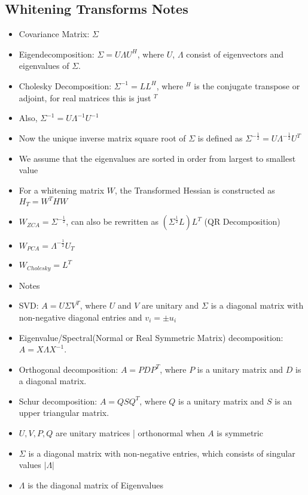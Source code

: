 \subsection{Whitening Transforms Notes}

\begin{itemize}

\item Covariance Matrix: $\Sigma$
\item Eigendecomposition: $\Sigma = U\Lambda U^{H}$, where $U$,  $\Lambda$ consist of eigenvectors and eigenvalues of $\Sigma$.
\item Cholesky Decomposition: $\Sigma^{-1} = LL^{H}$, where $^{H}$ is the conjugate transpose or adjoint, for real matrices this is just $^{T}$
\item Also, $\Sigma^{-1} = U \Lambda^{-1} U^{-1}$
\item Now the unique inverse matrix square root of $\Sigma$ is defined as  $\Sigma^{−\frac{1}{2}} = U\Lambda^{-\frac{1}{2}}U^{T}$
\item We assume that the eigenvalues are sorted in order from largest to smallest value
\item For a whitening matrix $W$, the Transformed Hessian is constructed as $H_{T} = W^{T}HW$
\item $W_{ZCA} = \Sigma^{−\frac{1}{2}}$, can also be rewritten as $(\Sigma^{\frac{1}{2}} L) L^{T}$ (QR Decomposition)
\item $W_{PCA} = \Lambda^{-\frac{1}{2}}U_{T}$
\item $W_{Cholesky} = L^{T}$
\item Notes
\item SVD: $A=U \Sigma V^T$, where $U$ and $V$ are unitary and $\Sigma$ is a diagonal matrix with non-negative diagonal entries and $v_i= \pm u_i$
\item Eigenvalue/Spectral(Normal or Real Symmetric Matrix) decomposition: $A=X \Lambda X^{-1}$.
\item Orthogonal decomposition: $A=P D P^T$, where $P$ is a unitary matrix and $D$ is a diagonal matrix.
\item Schur decomposition: $A=Q S Q^T$, where $Q$ is a unitary matrix and $S$ is an upper triangular matrix.
\item $U, V, P, Q$ are unitary matrices | orthonormal when $A$ is symmetric
\item $\Sigma$ is a diagonal matrix with non-negative entries, which consists of singular values $|\Lambda|$ 
\item $\Lambda$ is the diagonal matrix of Eigenvalues

\end{itemize}
